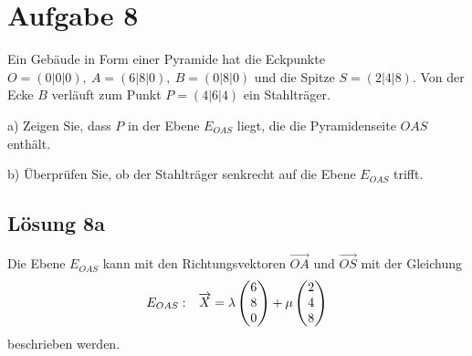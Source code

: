 \section{Aufgabe 8}

Ein Gebäude in Form einer Pyramide hat die Eckpunkte $\displaystyle O=( 0|0|0) ,\ A=( 6|8|0) ,\ B=( 0|8|0)$ und die Spitze $\displaystyle S=( 2|4|8)$. Von der Ecke $\displaystyle B$ verläuft zum Punkt $\displaystyle P=( 4|6|4)$ ein Stahlträger.

a) Zeigen Sie, dass $\displaystyle P$ in der Ebene $\displaystyle E_{OAS}$ liegt, die die Pyramidenseite $\displaystyle OAS$ enthält.

b) Überprüfen Sie, ob der Stahlträger senkrecht auf die Ebene $\displaystyle E_{OAS}$ trifft.



\subsection{Lösung 8a}

Die Ebene $\displaystyle E_{OAS}$ kann mit den Richtungsvektoren $\displaystyle \overrightarrow{OA}$ und $\displaystyle \overrightarrow{OS}$ mit der Gleichung
\begin{equation*}
	\begin{array}{ r l }
		E_{OAS} : & \vec{X} =\lambda \begin{pmatrix}
			6\\
			8\\
			0
		\end{pmatrix} +\mu \begin{pmatrix}
			2\\
			4\\
			8
		\end{pmatrix}
	\end{array}
\end{equation*}
beschrieben werden.

